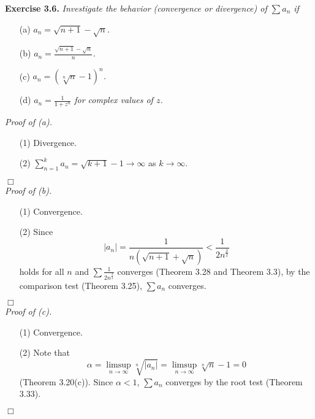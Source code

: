 \documentclass{article}
\begin{document}



\textbf{Exercise 3.6.}
\emph{Investigate the behavior (convergence or divergence) of $\sum a_n$ if}
\begin{enumerate}
\item[(a)]
\emph{$a_n = \sqrt{n+1} - \sqrt{n}$.}
\item[(b)]
\emph{$a_n = \frac{\sqrt{n+1} - \sqrt{n}}{n}$.}
\item[(c)]
\emph{$a_n = (\sqrt[n]{n} - 1)^n$.}
\item[(d)]
\emph{$a_n = \frac{1}{1+z^n}$ for complex values of $z$.} \\
\end{enumerate}

\emph{Proof of (a).}
\begin{enumerate}
\item[(1)]
Divergence.
\item[(2)]
$\sum_{n=1}^{k}a_n = \sqrt{k+1} - 1 \to \infty$ as $k \to \infty$.
\end{enumerate}
$\Box$ \\

\emph{Proof of (b).}
\begin{enumerate}
\item[(1)]
Convergence.
\item[(2)]
Since
$$|a_n|
= \frac{1}{n(\sqrt{n+1}+\sqrt{n})} < \frac{1}{2 n^{\frac{3}{2}}}$$
holds for all $n$ and $\sum \frac{1}{2 n^{\frac{3}{2}}}$ converges
(Theorem 3.28 and Theorem 3.3),
by the comparison test (Theorem 3.25), $\sum a_n$ converges.
\end{enumerate}
$\Box$ \\

\emph{Proof of (c).}
\begin{enumerate}
\item[(1)]
Convergence.
\item[(2)]
Note that
$$\alpha
= \limsup_{n \to \infty} \sqrt[n]{|a_n|}
= \limsup_{n \to \infty} \sqrt[n]{n} - 1 = 0$$
(Theorem 3.20(c)).
Since $\alpha < 1$, $\sum a_n$ converges by the root test (Theorem 3.33).
\end{enumerate}
$\Box$ \\
\end{document}
